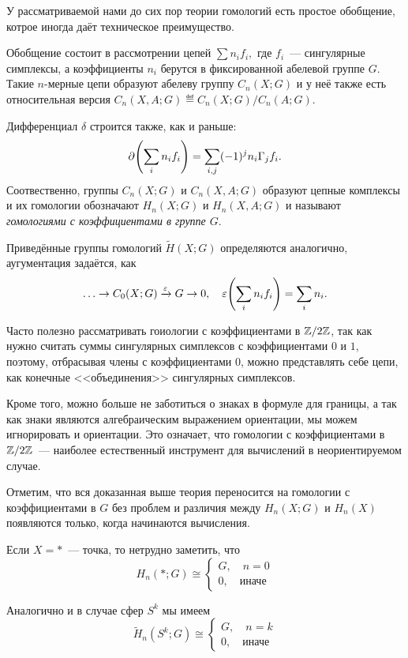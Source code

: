     У рассматриваемой нами до сих пор теории гомологий есть простое обобщение, котрое иногда даёт техническое преимущество.

    Обобщение состоит в рассмотрении цепей $\sum n_i f_i, $ где $f_i$~--- сингулярные симплексы, а коэффициенты $n_i$
    берутся в фиксированной абелевой группе $G$. Такие $n$-мерные цепи образуют абелеву группу $C_{n}(X; G)$ и у неё также есть относительная версия
    $C_{n}(X, A; G) \eqdef C_{n}(X; G)/ C_{n}(A; G)$.

    Дифференциал $\delta$ строится также, как и раньше:
    \[ \partial\lr*{\sum_{i} n_i f_i } = \sum_{i, j} (-1)^j n_i \Gamma_{j}f_i. \]
    Соотвественно, группы $C_{n}(X; G)$ и $C_{n}(X, A; G)$ образуют цепные комплексы и их гомологии обозначают
    $H_{n}(X; G)$ и $H_{n}(X, A; G)$ и называют \emph{гомологиями с коэффициентами в группе $G$}.

    Приведённые группы гомологий $\widetilde{H}(X; G)$ определяются аналогично, аугументация задаётся, как
    \[ \ldots \to C_{0}(X; G) \xrightarrow{\varepsilon} G \to 0, \quad \varepsilon\lr*{\sum_{i} n_i f_i} = \sum_{i} n_i.  \]

    \begin{remark}
       Часто полезно рассматривать гоиологии с коэффициентами в $\mathbb{Z}/2\mathbb{Z}$, так как нужно считать суммы сингулярных симплексов
        с коэффициентами $0$ и $1$, поэтому, отбрасывая члены с коэффициентами $0$, можно представлять себе цепи, как конечные <<объединения>> сингулярных симплексов.

        Кроме того, можно больше не заботиться о знаках в формуле для границы, а так как знаки являются алгебраическим выражением ориентации, мы можем игнорировать и ориентации.
        Это означает, что гомологии с коэффициентами в $\mathbb{Z}/2\mathbb{Z}$~--- наиболее естественный инструмент для вычислений в неориентируемом случае.
    \end{remark}

    Отметим, что вся доказанная выше теория переносится на гомологии с коэффициентами в $G$ без проблем и различия между
    $H_{n}(X; G)$ и $H_{n}(X)$ появляются только, когда начинаются вычисления.

    \begin{example}
        Если $X = *$~--- точка, то нетрудно заметить, что
        \[ H_{n}(*; G) \cong \begin{cases} G, \quad n = 0 \\ 0, \quad \text{иначе} \end{cases}\]

        Аналогично и в случае сфер $S^k$ мы имеем
        \[ \widetilde{H}_{n}(S^k; G) \cong \begin{cases} G, \quad n = k \\ 0, \quad \text{иначе} \end{cases}\]
    \end{example}










